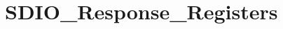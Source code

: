 \hypertarget{group___s_d_i_o___response___registers}{\section{S\-D\-I\-O\-\_\-\-Response\-\_\-\-Registers}
\label{group___s_d_i_o___response___registers}
}

